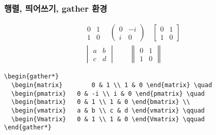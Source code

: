 \documentclass{beamer}
\begin{document}
\begin{frame}[fragile]
\frametitle{행렬, 띄어쓰기, gather 환경}

\begin{block}{}
\begin{gather*}
\begin{matrix}	 	0 & 1 \\ 1 & 0 \end{matrix} \quad
\begin{pmatrix}	0 & -i \\ i & 0 \end{pmatrix} \quad
\begin{bmatrix}	0 & 1 \\ 1 & 0 \end{bmatrix} \\
\begin{vmatrix}	a & b \\ c & d \end{vmatrix} \qquad
\begin{Vmatrix}	0 & 1 \\ 1 & 0 \end{Vmatrix} \qquad
\end{gather*}

\end{block}

\begin{block}{}
\begin{center}
\begin{verbatim}
\begin{gather*}
  \begin{matrix}	 	0 & 1 \\ 1 & 0 \end{matrix} \quad
  \begin{pmatrix}	0 & -i \\ i & 0 \end{pmatrix} \quad
  \begin{bmatrix}	0 & 1 \\ 1 & 0 \end{bmatrix} \\
  \begin{vmatrix}	a & b \\ c & d \end{vmatrix} \qquad
  \begin{Vmatrix}	0 & 1 \\ 1 & 0 \end{Vmatrix} \qquad
\end{gather*}
\end{verbatim}
\end{center}

\end{block}
\end{frame}
\end{document}
